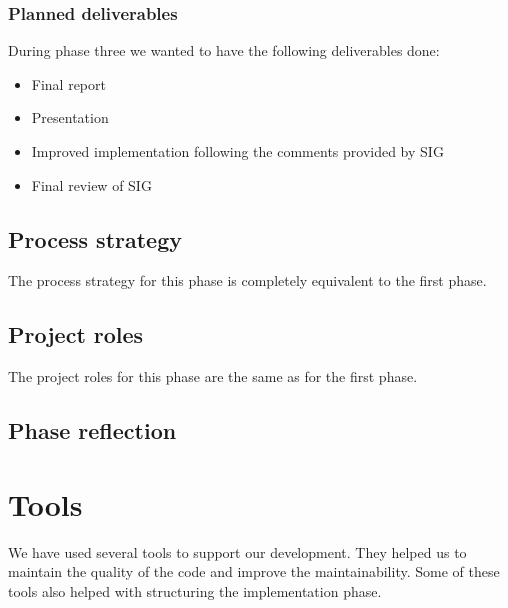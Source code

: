 \subsubsection{Planned deliverables}
During phase three we wanted to have the following deliverables done:
\begin{itemize}
\item Final report
\item Presentation
\item Improved implementation following the comments provided by SIG
\item Final review of SIG
\end{itemize}

\subsection{Process strategy}
The process strategy for this phase is completely equivalent to the first phase.

\subsection{Project roles}
The project roles for this phase are the same as for the first phase.

\subsection{Phase reflection}

\section{Tools}
We have used several tools to support our development.
They helped us to maintain the quality of the code and improve the maintainability.
Some of these tools also helped with structuring the implementation phase.

